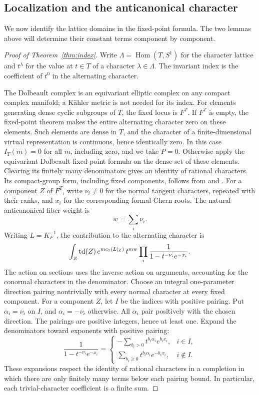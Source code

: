 \subsection{Localization and the anticanonical character}
\label{subsec:localization}

We now identify the lattice domains in the fixed-point formula. The two
lemmas above will determine their constant terms component by component.

\begin{proof}[Proof of Theorem~\ref{thm:index}]
Write \(\Lambda=\operatorname{Hom}(T,S^1)\) for the character lattice
and \(t^\lambda\) for the value at \(t\in T\) of a character
\(\lambda\in\Lambda\). The invariant index is the coefficient of
\(t^0\) in the alternating character.

The Dolbeault complex is an equivariant elliptic complex on any compact
complex manifold; a K\"ahler metric is not needed for its index.
For elements generating dense cyclic subgroups of \(T\), the fixed
locus is \(F^T\). If \(F^T\) is empty, the fixed-point theorem makes
the entire alternating character zero on these elements. Such elements
are dense in \(T\), and the character of a finite-dimensional virtual
representation is continuous, hence identically zero. In this case
\(I_T(m)=0\) for all \(m\), including zero, and we take \(P=0\).
Otherwise apply the equivariant Dolbeault fixed-point formula on the
dense set of these elements. Clearing its finitely many denominators
gives an identity of rational characters.
Its compact-group form, including fixed components, follows from
\cite[Theorem~2.12 and \S3]{AtiyahSegal1968} and
\cite[Theorems~3.9 and 4.3]{AtiyahSinger1968}.
For a component \(Z\) of \(F^T\), write \(\nu_i\ne0\) for the normal
tangent characters, repeated with their ranks, and \(x_i\) for the
corresponding formal Chern roots. The natural anticanonical fiber
weight is
\[
w=\sum_i\nu_i.
\]
Writing \(L=K_F^{-1}\), the contribution to the alternating character
is
\begin{equation}\label{eq:localization}
\int_Z \operatorname{td}(Z)\,e^{m c_1(L|_Z)}\,t^{mw}
\prod_i\frac1{1-t^{-\nu_i}e^{-x_i}}.
\end{equation}
The action on sections uses the inverse action on arguments, accounting
for the conormal characters in the denominator.
Choose an integral one-parameter direction pairing nontrivially with
every normal character at every fixed component.
For a component \(Z\), let \(I\) be the indices with positive pairing.
Put \(\alpha_i=\nu_i\) on \(I\), and \(\alpha_i=-\nu_i\) otherwise.
All \(\alpha_i\) pair positively with the chosen direction.
The pairings are positive integers, hence at least one.
Expand the denominators toward exponents with positive pairing:
\[
\frac1{1-t^{-\nu_i}e^{-x_i}}
=
\begin{cases}
-\displaystyle\sum_{b_i>0}t^{b_i\alpha_i}e^{b_ix_i},
&i\in I,\\[6pt]
\displaystyle\sum_{b_i\ge0}t^{b_i\alpha_i}e^{-b_ix_i},
&i\notin I.
\end{cases}
\]
These expansions respect the identity of rational characters in a
completion in which there are only finitely many terms below each
pairing bound. In particular, each trivial-character coefficient is
a finite sum.


\end{proof}
